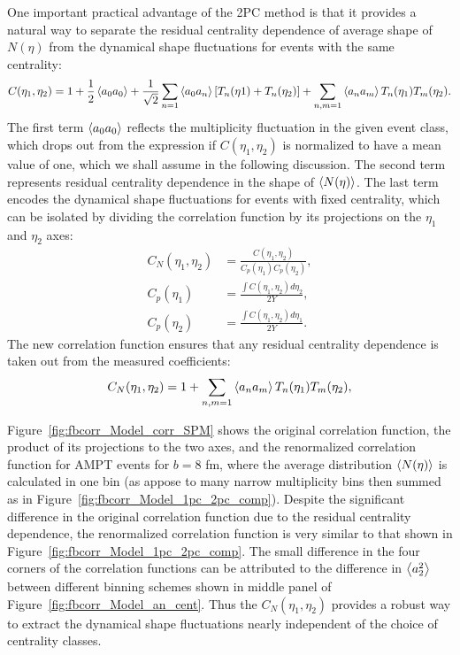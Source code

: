 One important practical advantage of the 2PC method is that it provides a natural way to separate the residual centrality dependence of average shape of $N(\eta)$ from the dynamical shape fluctuations for events with the same centrality:
\begin{equation}
C(\eta_1, \eta_2) = 1 + \frac{1}{2}\left\langle a_0 a_0\right\rangle + \frac{1}{\sqrt{2}}\sum_{n=1}\left\langle a_0 a_n\right\rangle[T_n(\eta1) + T_n(\eta_2)] + \sum_{n,m=1} \left\langle a_n a_m\right\rangle T_n(\eta_1)T_m(\eta_2).
\end{equation}
The first term $\left\langle a_0 a_0\right\rangle$ reflects the multiplicity fluctuation in the given event class, which drops out from the expression if $C(\eta_1, \eta_2)$ is normalized to have a mean value of one, which we shall assume in the following discussion. The second term represents residual centrality dependence in the shape of $\left\langle N(\eta)\right\rangle$. The last term encodes the dynamical shape fluctuations for events with fixed centrality, which can be isolated by dividing the correlation function by its projections on the $\eta_1$ and $\eta_2$ axes:
\begin{equation}
\begin{split}
C_N(\eta_1, \eta_2) &= \frac{C(\eta_1, \eta_2)}{C_p(\eta_1)C_p(\eta_2)}, \\
C_p(\eta_1) &= \frac{\int C(\eta_1, \eta_2) d\eta_2}{2Y}, \\
C_p(\eta_2) &= \frac{\int C(\eta_1, \eta_2) d\eta_1}{2Y}.
\end{split}
\end{equation}
The new correlation function ensures that any residual centrality dependence is taken out from the measured coefficients:
\begin{equation}
C_N(\eta_1, \eta_2) = 1 + \sum_{n,m=1} \left\langle a_n a_m\right\rangle T_n(\eta_1) T_m(\eta_2),
\end{equation}

Figure~\ref{fig:fbcorr_Model_corr_SPM} shows the original correlation function, the product of its projections to the two axes, and the renormalized correlation function for AMPT events for $b=8$ fm, where the average distribution $\left\langle N(\eta)\right\rangle$ is calculated in one bin (as appose to many narrow multiplicity bins then summed as in Figure~\ref{fig:fbcorr_Model_1pc_2pc_comp}). Despite the significant difference in the original correlation function due to the residual centrality dependence, the renormalized correlation function is very similar to that shown in Figure~\ref{fig:fbcorr_Model_1pc_2pc_comp}. The small difference in the four corners of the correlation functions can be attributed to the difference in $\left\langle a_2^2\right\rangle$  between different binning schemes shown in middle panel of Figure~\ref{fig:fbcorr_Model_an_cent}. Thus the $C_N(\eta_1, \eta_2)$ provides a robust way to extract the dynamical shape fluctuations nearly independent of the choice of centrality classes.

